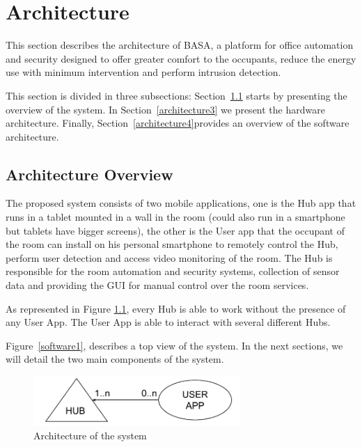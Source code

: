 \chapter{Architecture}
\label{chapter:architecture}

This section describes the architecture of BASA, a platform for office automation and security designed to offer greater comfort to the occupants, reduce the energy use with minimum intervention and perform intrusion detection.

This section is divided in three subsections: Section~\ref{architecture2} starts by presenting the overview of the system. In Section~\ref{architecture3} we present the hardware architecture. Finally, Section~\ref{architecture4}provides an overview of the software architecture.


\section{Architecture Overview}\label{architecture2} 


The proposed system consists of two mobile applications, one is the Hub app that runs in a tablet mounted in a wall in the room (could also run in a smartphone but tablets have bigger screens), the other is the User app that the occupant of the room can install on his personal smartphone to remotely control the Hub, perform user detection and access video monitoring of the room. The Hub is responsible for the room automation and security systems, collection of sensor data and providing the \ac{GUI} for manual control over the room services.


As represented in Figure \ref{architecture_system}, every Hub is able to work without the presence of any User App. The User App is able to interact with several different Hubs.

Figure~\ref{software1}, describes a top view of the system. In the next sections, we will detail the two main components of the system.

\begin{figure}[h]
\centering
\includegraphics[width=0.7\textwidth]{Figures/system_architecture}
\caption{Architecture of the system}
\label{architecture_system}
\end{figure}

